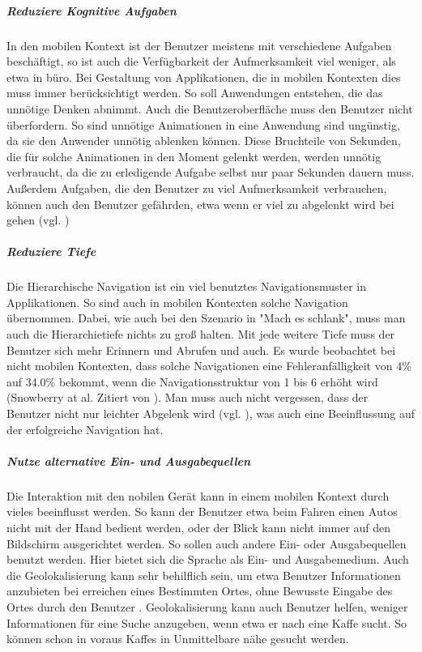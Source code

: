 \subparagraph{Reduziere Kognitive Aufgaben } 
\label{subp:reduziere_kognitive_aufgaben_}

In den mobilen Kontext ist der Benutzer meistens mit verschiedene Aufgaben beschäftigt, so ist auch die Verfügbarkeit der Aufmerksamkeit viel weniger, als etwa in büro. Bei Gestaltung von Applikationen, die in mobilen Kontexten dies muss immer berücksichtigt werden. So soll Anwendungen entstehen, die das unnötige Denken abnimmt. Auch die Benutzeroberfläche muss den Benutzer nicht überfordern. So sind unnötige Animationen in eine Anwendung sind ungünstig, da sie den Anwender unnötig ablenken können. Diese Bruchteile von Sekunden, die für solche Animationen in den Moment gelenkt werden, werden unnötig verbraucht, da die zu erledigende Aufgabe selbst nur paar Sekunden dauern muss. Außerdem Aufgaben, die den Benutzer zu viel Aufmerksamkeit verbrauchen, können auch den Benutzer gefährden, etwa wenn er viel zu abgelenkt wird bei gehen (vgl. \cite{Nasar:2008cc})

\subparagraph{Reduziere Tiefe} 
\label{subp:reduziere_das_w_hlen}

Die Hierarchische Navigation ist ein viel benutztes Navigationsmuster in Applikationen. So sind auch in mobilen Kontexten solche Navigation übernommen. Dabei, wie auch bei den Szenario in "Mach es schlank", muss man auch die Hierarchietiefe nichts zu groß halten. Mit jede weitere Tiefe muss der Benutzer sich mehr Erinnern und Abrufen und auch. Es wurde beobachtet bei nicht mobilen Kontexten, dass solche Navigationen eine Fehleranfälligkeit von 4\% auf 34.0\% bekommt, wenn die Navigationsstruktur von 1 bis 6 erhöht wird (Snowberry at al. Zitiert von \cite{Chae:2004gp}). Man muss auch nicht vergessen, dass der Benutzer nicht nur leichter Abgelenk wird (vgl. \cite{Oulasvirta:2005vn}), was auch eine Beeinflussung auf der erfolgreiche Navigation hat.

\subparagraph{Nutze alternative Ein- und Ausgabequellen}
\label{subp:nutze_alternative_eingabenger_ten}

Die Interaktion mit den nobilen Gerät kann in einem mobilen Kontext durch vieles beeinflusst werden. So kann der Benutzer etwa beim Fahren einen Autos nicht mit der Hand bedient werden, oder der Blick kann nicht immer auf den Bildschirm ausgerichtet werden. So sollen auch andere Ein- oder Ausgabequellen benutzt werden. Hier bietet sich die Sprache als Ein- und Ausgabemedium.
Auch die Geolokalisierung kann sehr behilflich sein, um etwa Benutzer Informationen anzubieten bei erreichen eines Bestimmten Ortes, ohne Bewusste Eingabe des Ortes durch den Benutzer . Geolokalisierung kann auch Benutzer helfen, weniger Informationen für eine Suche anzugeben, wenn etwa er nach eine Kaffe sucht. So können schon in voraus Kaffes in Unmittelbare nähe gesucht werden.


